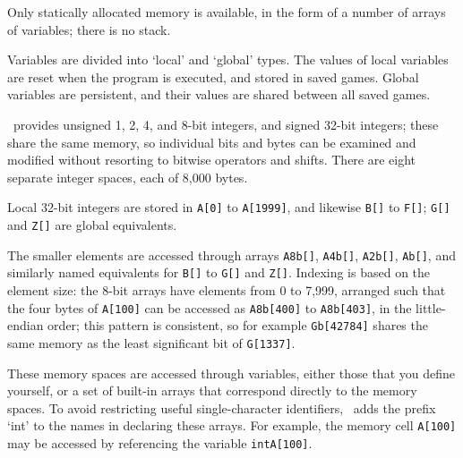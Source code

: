 \label{sec:memory}

  Only statically allocated memory is available, in the form of a number of
  arrays of variables; there is no stack.

  Variables are divided into `local' and `global' types.  The values of local
  variables are reset when the program is executed, and stored in saved games.
  Global variables are persistent, and their values are shared between all saved
  games.

  \label{sec:integers}


      \reallive\ provides unsigned 1, 2, 4, and 8-bit integers, and signed
      32-bit integers; these share the same memory, so individual bits and bytes
      can be examined and modified without resorting to bitwise operators and
      shifts. There are eight separate integer spaces, each of 8,000 bytes.

      Local 32-bit integers are stored in \lstinline|A[0]| to
      \lstinline|A[1999]|, and likewise \lstinline|B[]| to \lstinline|F[]|;
      \lstinline|G[]| and \lstinline|Z[]| are global equivalents.

      The smaller elements are accessed through arrays \lstinline|A8b[]|,
      \lstinline|A4b[]|, \lstinline|A2b[]|, \lstinline|Ab[]|, and similarly
      named equivalents for \lstinline|B[]| to \lstinline|G[]| and
      \lstinline|Z[]|. Indexing is based on the element size: the 8-bit arrays
      have elements from 0 to 7,999, arranged such that the four bytes of
      \lstinline|A[100]| can be accessed as \lstinline|A8b[400]| to
      \lstinline|A8b[403]|, in the little-endian order; this pattern is
      consistent, so for example \lstinline|Gb[42784]| shares the same memory
      as the least significant bit of \lstinline|G[1337]|.

      These memory spaces are accessed through variables, either those that you 
      define yourself, or a set of built-in arrays that correspond directly to 
      the memory spaces.  To avoid restricting useful single-character 
      identifiers, \compiler\ adds the prefix `int' to the names in declaring 
      these arrays.  For example, the memory cell \lstinline|A[100]| may be
      accessed by referencing the variable \lstinline|intA[100]|.

    \label{sec:store}

